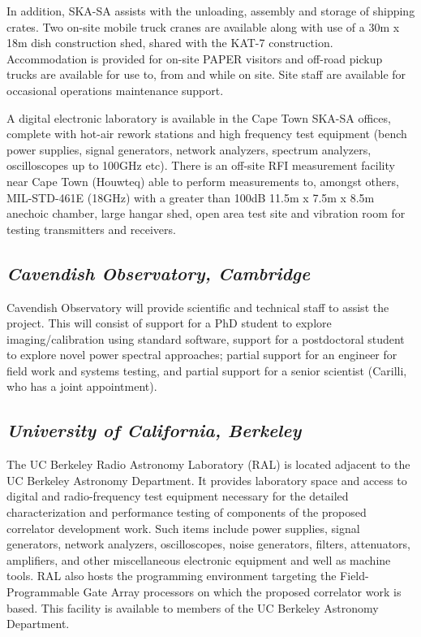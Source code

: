\documentclass[11pt]{article}
\begin{document}
In addition, SKA-SA assists with the unloading, assembly and storage of
shipping crates. Two on-site mobile truck cranes are available along with use
of a 30m x 18m dish construction shed, shared with the KAT-7 construction.
Accommodation is provided for on-site PAPER visitors and off-road pickup trucks
are available for use to, from and while on site.  Site staff are available for occasional operations maintenance support.

A digital electronic laboratory is available in the Cape Town SKA-SA offices,
complete with hot-air rework stations and high frequency test equipment
(bench power supplies, signal generators, network analyzers, spectrum
analyzers, oscilloscopes up to 100GHz etc). There is an off-site RFI
measurement facility near Cape Town (Houwteq) able to perform measurements to,
amongst others, MIL-STD-461E (18GHz) with a greater than 100dB 11.5m x 7.5m x
8.5m anechoic chamber, large hangar shed, open area test site and vibration
room for testing transmitters and receivers.

\subsection*{\it Cavendish Observatory, Cambridge}

Cavendish Observatory will provide scientific and technical staff to assist the project.  This will consist of
support for a PhD student to explore imaging/calibration using standard software,
support for a postdoctoral student 
to explore novel power spectral approaches; 
partial support for an engineer for field work and systems testing,
and partial support for a senior scientist (Carilli, who has a joint appointment).

\subsection*{\it University of California, Berkeley}

The UC Berkeley Radio Astronomy Laboratory (RAL) is located adjacent to the UC
Berkeley Astronomy Department. It provides laboratory space and access to
digital and radio-frequency test equipment necessary for the detailed
characterization and performance testing of components of the proposed correlator
development work. Such items include power supplies, signal generators, network
analyzers, oscilloscopes, noise generators, filters, attenuators, amplifiers,
and other miscellaneous electronic equipment and well as machine tools. RAL also hosts the programming
environment targeting the Field-Programmable Gate Array processors on which the
proposed correlator work is based. This facility is available to members of the
UC Berkeley Astronomy Department.
\end{document}
